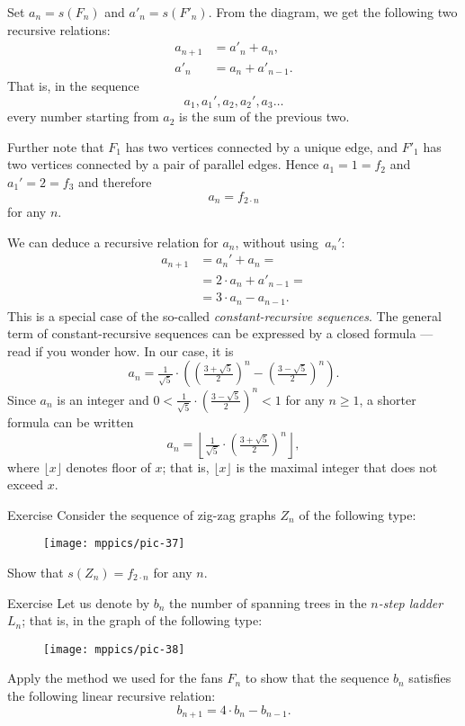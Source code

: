 Set $a_n=s(F_n)$ and $a'_n=s(F'_n)$.
From the diagram, we get the following two recursive relations:
\begin{align*}
a_{n+1}&=a'_n+a_n,
\\
a'_n&=a_n+a'_{n-1}.
\end{align*}
That is, in the sequence 
\[a_1,a_1',a_2,a_2',a_3\dots\]
every number starting from $a_2$ is the sum of the previous two.

Further note that $F_1$ has two vertices connected by a unique edge,
and  $F'_1$ has two vertices connected by a pair of parallel edges.
Hence $a_1=1=f_2$ and $a_1'=2=f_3$ and therefore 
\[a_n=f_{2\cdot n}\]
for any $n$.\qeds

We can deduce a recursive relation for $a_n$, without using~$a_n'$:
\begin{align*}
a_{n+1}&=a_n'+a_n=
\\
&=2\cdot a_n+a'_{n-1}=
\\
&=3\cdot a_n-a_{n-1}.
\end{align*}
This is a special case of the so-called \emph{constant-recursive sequences}.
The general term of constant-recursive sequences can be expressed by a closed formula ---
read \cite{jordan} if you wonder how.
In our case, it is
\[a_n=\tfrac1{\sqrt{5}}\cdot
\left(
(\tfrac{3+\sqrt{5}}2)^n-(\tfrac{3-\sqrt{5}}2)^n
\right).\]
Since $a_n$ is an integer and $0<\tfrac1{\sqrt{5}}\cdot(\tfrac{3-\sqrt{5}}2)^n<1$ for any $n\ge 1$, a shorter formula can be written
\[a_n
=
\left\lfloor\tfrac1{\sqrt{5}}\cdot(\tfrac{3+\sqrt{5}}2)^n\right\rfloor,\]
where $\lfloor x\rfloor$ denotes floor of $x$; 
that is, $\lfloor x\rfloor$ is the maximal integer that does not exceed $x$.

\begin{thm}{Exercise}\label{ex:zig-zag}
Consider the sequence of zig-zag graphs $Z_n$ of the following type:
\begin{figure}[ht!]
\centering
\texttt{[image: mppics/pic-37]}
\end{figure}

Show that $s(Z_n)=f_{2\cdot n}$ for any $n$. 
\end{thm}

\begin{thm}{Exercise}\label{ex:ladder}
Let us denote by $b_n$ the number of spanning trees in the \label{page:ladder}\emph{$n$-step ladder} $L_n$; that is, in the graph of the following type:

\begin{figure}[ht!]
\centering
\texttt{[image: mppics/pic-38]}
\end{figure}

Apply the method we used for the fans $F_n$ to show that the sequence $b_n$ satisfies the following linear recursive relation:
\[b_{n+1}=4\cdot b_n-b_{n-1}.\]

\end{thm}

